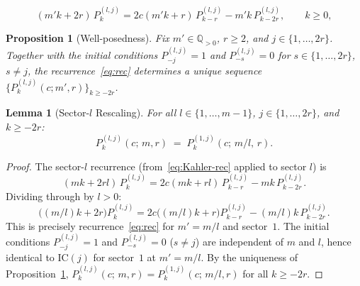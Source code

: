 \documentclass[10pt,a4paper]{amsart}
\newtheorem{proposition}{Proposition}
\newtheorem{lemma}{Lemma}
\newcommand{\Plk}[2]{P^{(#1)}_{#2}}
\newcommand{\Q}{\mathbb{Q}}
\begin{document}
  \begin{equation}\label{eq:rec}
    (m'k+2r)\,\Plk{l,j}{k} = 2c(m'k+r)\,\Plk{l,j}{k-r} - m'k\,\Plk{l,j}{k-2r},
    \qquad k\geq 0,
  \end{equation}

\begin{proposition}[Well-posedness]\label{prop:unique}
  Fix $m'\in\Q_{>0}$, $r\geq 2$, and $j\in\{1,\ldots,2r\}$.
  Together with the initial conditions $\Plk{l,j}{-j}=1$ and $\Plk{l,j}{-s}=0$
  for $s\in\{1,\ldots,2r\}$, $s\neq j$,
  the recurrence~\eqref{eq:rec} determines a unique sequence
  $\{\Plk{l,j}{k}(c;m',r)\}_{k\geq -2r}$.
\end{proposition}

\begin{lemma}[Sector-$l$ Rescaling]\label{lem:rescaling}
  For all $l\in\{1,\ldots,m-1\}$, $j\in\{1,\ldots,2r\}$, and $k\geq -2r$:
  \begin{equation}\label{eq:rescaling}
    \Plk{l,j}{k}(c;\,m,r) \;=\; \Plk{1,j}{k}(c;\,m/l,\,r).
  \end{equation}
\end{lemma}

\begin{proof}
  The sector-$l$ recurrence (from~\eqref{eq:Kahler-rec} applied to sector $l$) is
  \[
    (mk+2rl)\,\Plk{l,j}{k} = 2c(mk+rl)\,\Plk{l,j}{k-r} - mk\,\Plk{l,j}{k-2r}.
  \]
  Dividing through by $l>0$:
  \[
    \bigl((m/l)k+2r\bigr)\Plk{l,j}{k}
    = 2c\bigl((m/l)k+r\bigr)\Plk{l,j}{k-r}
    - (m/l)k\,\Plk{l,j}{k-2r}.
  \]
  This is precisely recurrence~\eqref{eq:rec} for $m'=m/l$ and sector~$1$.
  The initial conditions $\Plk{l,j}{-j}=1$ and $\Plk{l,j}{-s}=0$ ($s\neq j$)
  are independent of $m$ and $l$, hence identical to $\mathrm{IC}(j)$ for sector~$1$
  at $m'=m/l$.
  By the uniqueness of Proposition~\ref{prop:unique},
  $\Plk{l,j}{k}(c;\,m,r) = \Plk{1,j}{k}(c;\,m/l,r)$ for all $k\geq -2r$.
\end{proof}
\end{document}
